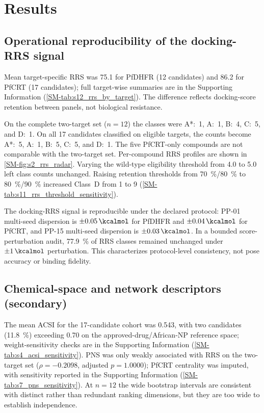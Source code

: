 \documentclass[journal=jcisd8,manuscript=article,layout=traditional]{achemso}
\begin{document}

\section{Results}

\subsection{Operational reproducibility of the docking-RRS signal}

Mean target-specific RRS was 75.1 for PfDHFR (12 candidates) and 86.2 for PfCRT (17 candidates); full target-wise summaries are in the Supporting Information (\cref{SM-tab:s12_rrs_by_target}). The difference reflects docking-score retention between panels, not biological resistance.

On the complete two-target set ($n=\num{12}$) the classes were A*:~\num{1}, A:~\num{1}, B:~\num{4}, C:~\num{5}, and D:~\num{1}. On all 17 candidates classified on eligible targets, the counts become A*:~\num{5}, A:~\num{1}, B:~\num{5}, C:~\num{5}, and D:~\num{1}. The five PfCRT-only compounds are not comparable with the two-target set. Per-compound RRS profiles are shown in \cref{SM-fig:s2_rrs_radar}. Varying the wild-type eligibility threshold from \qty{4.0}{\kcalmol} to \qty{5.0}{\kcalmol} left class counts unchanged. Raising retention thresholds from \qty{70}{\percent}/\qty{80}{\percent} to \qty{80}{\percent}/\qty{90}{\percent} increased Class~D from 1 to 9 (\cref{SM-tab:s11_rrs_threshold_sensitivity}).

The docking-RRS signal is reproducible under the declared protocol: PP-01 multi-seed dispersion is $\pm\qty{0.05}{\kcalmol}$ for PfDHFR and $\pm\qty{0.04}{\kcalmol}$ for PfCRT, and PP-15 multi-seed dispersion is $\pm\qty{0.03}{\kcalmol}$. In a bounded score-perturbation audit, \qty{77.9}{\percent} of RRS classes remained unchanged under $\pm\qty{1}{\kcalmol}$ perturbation. This characterizes protocol-level consistency, not pose accuracy or binding fidelity.

\subsection{Chemical-space and network descriptors (secondary)}

The mean ACSI for the 17-candidate cohort was \num{0.543}, with two candidates (\qty{11.8}{\percent}) exceeding \num{0.70} on the approved-drug/African-NP reference space; weight-sensitivity checks are in the Supporting Information (\cref{SM-tab:s4_acsi_sensitivity}). PNS was only weakly associated with RRS on the two-target set ($\rho=\num{-0.2098}$, adjusted $p=\num{1.0000}$); PfCRT centrality was imputed, with sensitivity reported in the Supporting Information (\cref{SM-tab:s7_pns_sensitivity}). At $n=\num{12}$ the wide bootstrap intervals are consistent with distinct rather than redundant ranking dimensions, but they are too wide to establish independence.
\end{document}

